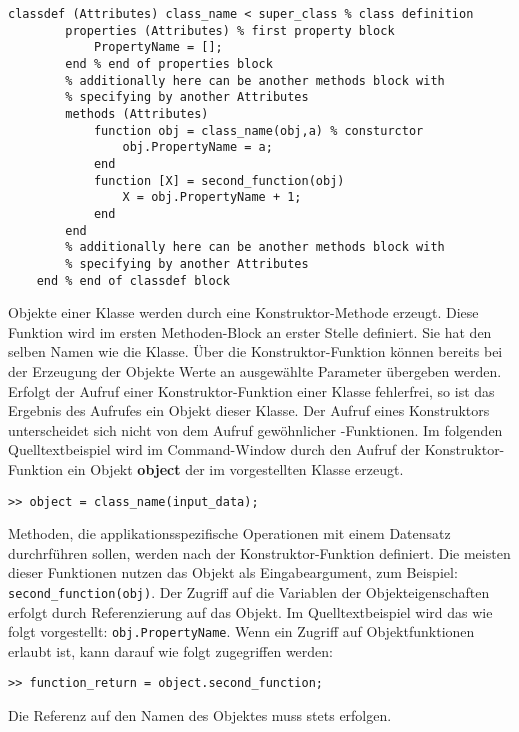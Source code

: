 \begin{lstlisting}[float=h!,caption={Beispiel Klassendefinition},label={Klassendefinition}, frame=none]
	classdef (Attributes) class_name < super_class % class definition
		properties (Attributes) % first property block
			PropertyName = [];
		end % end of properties block
		% additionally here can be another methods block with 
		% specifying by another Attributes
		methods (Attributes) 
			function obj = class_name(obj,a) % consturctor
				obj.PropertyName = a;
			end
			function [X] = second_function(obj)
				X = obj.PropertyName + 1;
			end
		end
		% additionally here can be another methods block with 
		% specifying by another Attributes
	end % end of classdef block
\end{lstlisting}

Objekte einer Klasse werden durch eine Konstruktor-Methode erzeugt. Diese
Funktion wird im ersten Methoden-Block an erster Stelle definiert. Sie hat den
selben Namen wie die Klasse. \"Uber die Konstruktor-Funktion k\"onnen bereits
bei der Erzeugung der Objekte Werte an ausgew\"ahlte Parameter \"ubergeben
werden. Erfolgt der Aufruf einer Konstruktor-Funktion einer Klasse fehlerfrei,
so ist das Ergebnis des Aufrufes ein Objekt dieser Klasse. Der Aufruf eines
Konstruktors unterscheidet sich nicht von dem Aufruf gew\"ohnlicher
\matlab-Funktionen. Im folgenden Quelltextbeispiel wird im Command-Window durch
den Aufruf der Konstruktor-Funktion ein Objekt \textbf{object} der im
 vorgestellten Klasse erzeugt.
\begin{lstlisting}[frame=none]
	>> object = class_name(input_data);
\end{lstlisting}

Methoden, die applikationsspezifische Operationen mit einem Datensatz
durchrf\"uhren sollen, werden nach der Konstruktor-Funktion definiert.  Die
meisten dieser Funktionen nutzen das Objekt als Eingabeargument, zum Beispiel:
\lstinline{second_function(obj)}. Der Zugriff auf die Variablen der
Objekteigenschaften erfolgt durch Referenzierung auf das Objekt. Im
Quelltextbeispiel  wird das wie folgt vorgestellt:
\lstinline{obj.PropertyName}. Wenn ein Zugriff auf Objektfunktionen erlaubt ist,
kann darauf wie folgt zugegriffen werden:

\begin{lstlisting}[frame=none]
	>> function_return = object.second_function;
\end{lstlisting}
\noindent Die Referenz auf den Namen des Objektes muss stets erfolgen.


